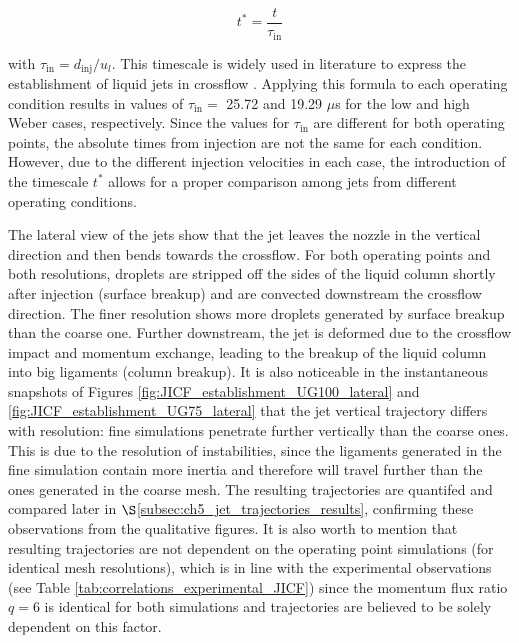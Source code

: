 \begin{equation}
\label{eq:t_dimensionless_with_tau_in}
t^* = \frac{t}{\tau_\mathrm{in}}
\end{equation}

with $\tau_\mathrm{in} = d_\mathrm{inj}/u_l$. This timescale is widely used in literature to express the establishment of liquid jets in crossflow . Applying this formula to each operating condition results in values of $\tau_\mathrm{in} = $ 25.72 and 19.29 $\mu$s for the low and high Weber cases, respectively. Since the values for $\tau_\mathrm{in}$ are different for both operating points, the absolute times from injection are not the same for each condition. However, due to the different injection velocities in each case, the introduction of the timescale $t^*$ allows for a proper comparison among jets from different operating conditions.


The lateral view of the jets show that the jet leaves the nozzle in the vertical direction and then bends towards the crossflow. For both operating points and both resolutions, droplets are stripped off the sides of the liquid column shortly after injection (surface breakup) and are convected downstream the crossflow direction. The finer resolution shows more droplets generated by surface breakup than the coarse one. Further downstream, the jet is deformed due to the crossflow impact and momentum exchange, leading to the breakup of the liquid column into big ligaments (column breakup). It is also noticeable in the instantaneous snapshots of Figures \ref{fig:JICF_establishment_UG100_lateral} and \ref{fig:JICF_establishment_UG75_lateral} that the jet vertical trajectory differs with resolution: fine simulations penetrate further vertically than the coarse ones. This is due to the resolution of instabilities, since the ligaments generated in the fine simulation contain more inertia and therefore will travel further than the ones generated in the coarse mesh. The resulting trajectories are quantifed and compared later in $\S$\ref{subsec:ch5_jet_trajectories_results}, confirming these observations from the qualitative figures. It is also worth to mention that resulting trajectories are not dependent on the operating point simulations (for identical mesh resolutions), which is in line with the experimental observations (see Table \ref{tab:correlations_experimental_JICF}) since the momentum flux ratio $q = 6$ is identical for both simulations and trajectories are believed to be solely dependent on this factor.

